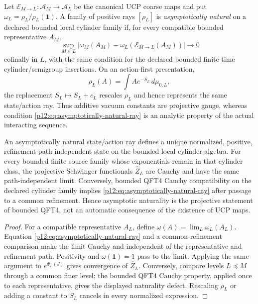 \documentclass[12pt,a4paper]{article}
\begin{document}
\begin{definition}
\label{p12:def:asymptotically-natural-state-action-ray}
Let \(\mathcal E_{M\to L}:\mathcal A_M\to\mathcal A_L\) be the canonical UCP
coarse maps and put \(\omega_L=\rho_L/\rho_L(\mathbf1)\).  A family of
positive rays \([\rho_L]\) is \emph{asymptotically natural} on a declared
bounded local cylinder family if, for every compatible bounded representative
\(A_M\),
\begin{equation}
\label{p12:eq:asymptotically-natural-ray}
 \sup_{M\succeq L}
 \left|\omega_M(A_M)
 -\omega_L\!\left(\mathcal E_{M\to L}(A_M)\right)\right|
 \longrightarrow0
\end{equation}
cofinally in \(L\), with the same condition for the declared bounded
finite-time cylinder/semigroup insertions.  On an action-first presentation,
\[
 \rho_L(A)=\int A e^{-S_L}\,d\mu_{0,L},
\]
the replacement \(S_L\mapsto S_L+c_L\) rescales \(\rho_L\) and hence
represents the same state/action ray.  Thus additive vacuum constants are
projective gauge, whereas condition
\eqref{p12:eq:asymptotically-natural-ray} is an analytic property of the
actual interacting sequence.
\end{definition}

\begin{theorem}
\label{p12:thm:projective-state-action-ray-qft4}
An asymptotically natural state/action ray defines a unique normalized,
positive, refinement-path-independent state on the bounded local cylinder
algebra.  For every bounded finite source family whose exponentials remain in
that cylinder class, the projective Schwinger functionals \(\widehat Z_L\)
are Cauchy and have the same path-independent limit.  Conversely, bounded
QFT4 Cauchy compatibility on the declared cylinder family implies
\eqref{p12:eq:asymptotically-natural-ray} after passage to a common
refinement.  Hence asymptotic naturality is the projective statement of
bounded QFT4, not an automatic consequence of the existence of UCP maps.
\end{theorem}

\begin{proof}
For a compatible representative \(A_L\), define
\(\omega(A)=\lim_L\omega_L(A_L)\).  Equation
\eqref{p12:eq:asymptotically-natural-ray} and a common-refinement comparison
make the limit Cauchy and independent of the representative and refinement
path.  Positivity and \(\omega(\mathbf1)=1\) pass to the limit.  Applying the
same argument to \(e^{\Psi_L(J)}\) gives convergence of
\(\widehat Z_L\).  Conversely, compare levels \(L\preceq M\) through a
common finer level; the bounded QFT4 Cauchy property, applied once to each
representative, gives the displayed naturality defect.  Rescaling \(\rho_L\)
or adding a constant to \(S_L\) cancels in every normalized expression.
\end{proof}
\end{document}
